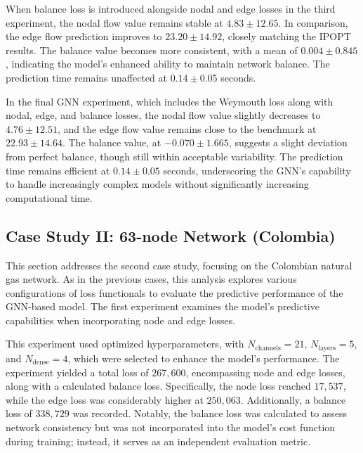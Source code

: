 When balance loss is introduced alongside nodal and edge losses in the third experiment, the nodal flow value remains stable at \( 4.83 \pm 12.65 \). In comparison, the edge flow prediction improves to \( 23.20 \pm 14.92 \), closely matching the IPOPT results. The balance value becomes more consistent, with a mean of \( 0.004 \pm 0.845 \), indicating the model's enhanced ability to maintain network balance. The prediction time remains unaffected at \( 0.14 \pm 0.05 \) seconds.

In the final GNN experiment, which includes the Weymouth loss along with nodal, edge, and balance losses, the nodal flow value slightly decreases to \( 4.76 \pm 12.51 \), and the edge flow value remains close to the benchmark at \( 22.93 \pm 14.64 \). The balance value, at \( -0.070 \pm 1.665 \), suggests a slight deviation from perfect balance, though still within acceptable variability. The prediction time remains efficient at \( 0.14 \pm 0.05 \) seconds, underscoring the GNN's capability to handle increasingly complex models without significantly increasing computational time.





\subsection{Case Study II: 63-node Network (Colombia)}


This section addresses the second case study, focusing on the Colombian natural gas network. As in the previous cases, this analysis explores various configurations of loss functionals to evaluate the predictive performance of the GNN-based model. The first experiment examines the model's predictive capabilities when incorporating node and edge losses.


This experiment used optimized hyperparameters, with \( N_{\text{channels}} = 21 \), \( N_{\text{layers}} = 5 \), and \( N_{\text{dense}} = 4 \), which were selected to enhance the model's performance. The experiment yielded a total loss of \( 267,600 \), encompassing node and edge losses, along with a calculated balance loss. Specifically, the node loss reached \( 17,537 \), while the edge loss was considerably higher at \( 250,063 \). Additionally, a balance loss of \( 338,729 \) was recorded. Notably, the balance loss was calculated to assess network consistency but was not incorporated into the model's cost function during training; instead, it serves as an independent evaluation metric. 

